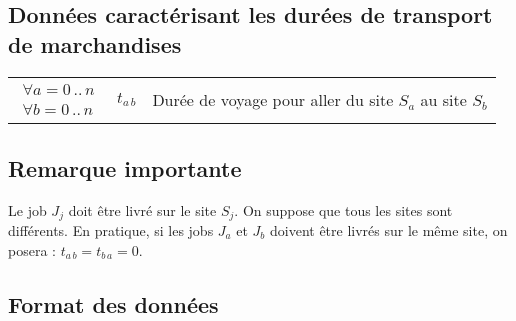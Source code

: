 \subsection*{Données caractérisant les durées de transport de marchandises}

\begin{tabular}{ccl}
$ \begin{array}{l} \forall a = 0 \, .. \, n \\ \forall b = 0 \, .. \, n \end{array} $ & $ t_{a \, b} $ & Durée de voyage pour aller du site $ S_{a} $ au site $ S_{b} $ \\
\end{tabular}

\subsection*{Remarque importante}

Le job $ J_{j} $ doit être livré sur le site $ S_{j} $.
On suppose que tous les sites sont différents.
En pratique, si les jobs $ J_{a} $ et $ J_{b} $ doivent être livrés sur le même site, on posera : $ t_{a \, b} = t_{b \, a} = 0 $.

\subsection*{Format des données}

